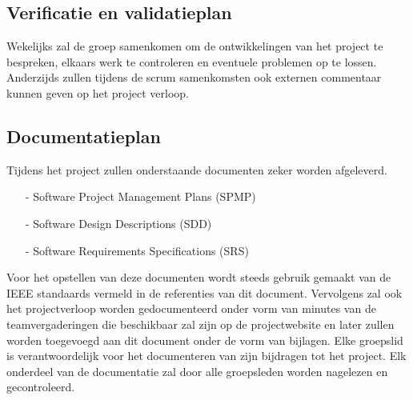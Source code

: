 \documentclass{article}
\begin{document}
\subsection{Verificatie en validatieplan}

Wekelijks zal de groep samenkomen om de ontwikkelingen van het project te bespreken, elkaars werk te controleren en eventuele problemen op te lossen. Anderzijds zullen tijdens de scrum samenkomsten ook externen commentaar kunnen geven op het project verloop.

\subsection{Documentatieplan}

Tijdens het project zullen onderstaande documenten zeker worden afgeleverd.
\begin{itemize}
\item[-] Software Project Management Plans (SPMP)\\[-5mm]
\item[-] Software Design Descriptions (SDD)\\[-5mm]
\item[-] Software Requirements Specifications (SRS)\\[-5mm]
\end{itemize}

Voor het opstellen van deze documenten wordt steeds gebruik gemaakt van de IEEE standaards vermeld in de referenties van dit document.
Vervolgens zal ook het projectverloop worden gedocumenteerd onder vorm van minutes van de teamvergaderingen die beschikbaar zal zijn op de projectwebsite en later zullen worden toegevoegd aan dit document onder de vorm van bijlagen.
Elke groepslid is verantwoordelijk voor het documenteren van zijn bijdragen tot het project. Elk onderdeel van de documentatie zal door alle groepsleden worden nagelezen en gecontroleerd.

\end{document}
